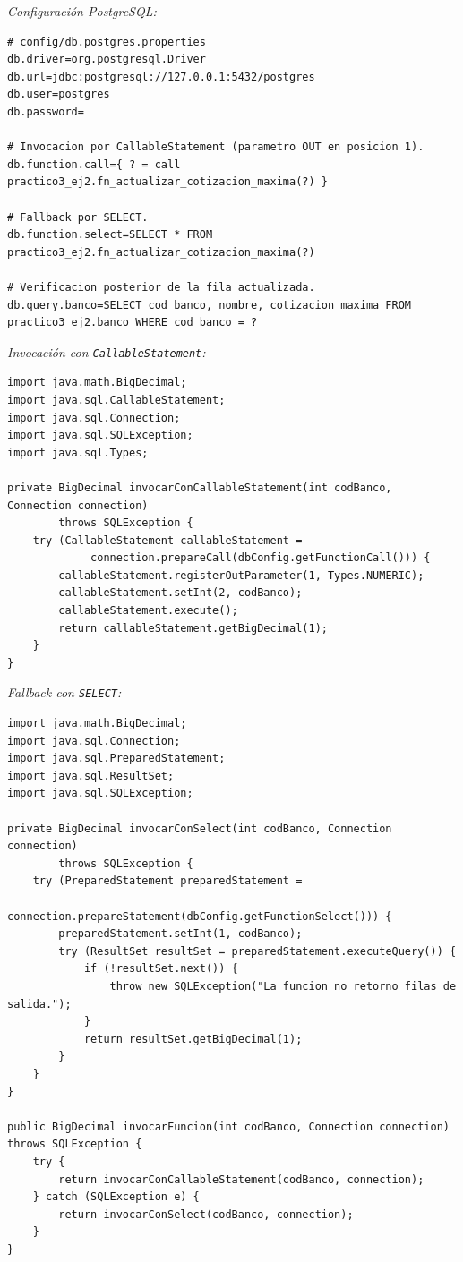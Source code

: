\documentclass[11pt,a4paper]{article}
\begin{document}
\textit{Configuración PostgreSQL:}

\begin{lstlisting}[style=propsstyle]
# config/db.postgres.properties
db.driver=org.postgresql.Driver
db.url=jdbc:postgresql://127.0.0.1:5432/postgres
db.user=postgres
db.password=

# Invocacion por CallableStatement (parametro OUT en posicion 1).
db.function.call={ ? = call practico3_ej2.fn_actualizar_cotizacion_maxima(?) }

# Fallback por SELECT.
db.function.select=SELECT * FROM practico3_ej2.fn_actualizar_cotizacion_maxima(?)

# Verificacion posterior de la fila actualizada.
db.query.banco=SELECT cod_banco, nombre, cotizacion_maxima FROM practico3_ej2.banco WHERE cod_banco = ?
\end{lstlisting}

\textit{Invocación con \texttt{CallableStatement}:}

\begin{lstlisting}
import java.math.BigDecimal;
import java.sql.CallableStatement;
import java.sql.Connection;
import java.sql.SQLException;
import java.sql.Types;

private BigDecimal invocarConCallableStatement(int codBanco, Connection connection)
        throws SQLException {
    try (CallableStatement callableStatement =
             connection.prepareCall(dbConfig.getFunctionCall())) {
        callableStatement.registerOutParameter(1, Types.NUMERIC);
        callableStatement.setInt(2, codBanco);
        callableStatement.execute();
        return callableStatement.getBigDecimal(1);
    }
}
\end{lstlisting}

\textit{Fallback con \texttt{SELECT}:}

\begin{lstlisting}
import java.math.BigDecimal;
import java.sql.Connection;
import java.sql.PreparedStatement;
import java.sql.ResultSet;
import java.sql.SQLException;

private BigDecimal invocarConSelect(int codBanco, Connection connection)
        throws SQLException {
    try (PreparedStatement preparedStatement =
             connection.prepareStatement(dbConfig.getFunctionSelect())) {
        preparedStatement.setInt(1, codBanco);
        try (ResultSet resultSet = preparedStatement.executeQuery()) {
            if (!resultSet.next()) {
                throw new SQLException("La funcion no retorno filas de salida.");
            }
            return resultSet.getBigDecimal(1);
        }
    }
}

public BigDecimal invocarFuncion(int codBanco, Connection connection) throws SQLException {
    try {
        return invocarConCallableStatement(codBanco, connection);
    } catch (SQLException e) {
        return invocarConSelect(codBanco, connection);
    }
}
\end{lstlisting}
\end{document}
